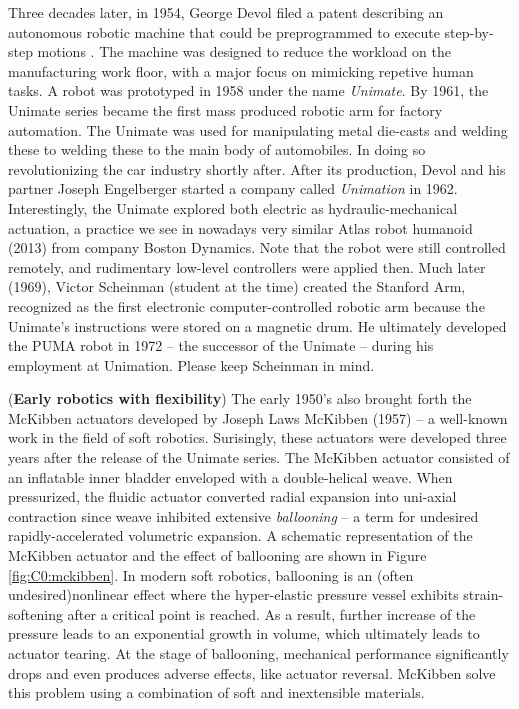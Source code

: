 Three decades later, in 1954, George Devol filed a patent describing an autonomous robotic machine that could be preprogrammed to execute step-by-step motions \cite{Mickle2008}. The machine was designed to reduce the workload on the manufacturing work floor, with a major focus on mimicking repetive human tasks. A robot was prototyped in 1958 under the name \emph{Unimate}. By 1961, the Unimate series became the first mass produced robotic arm for factory automation. The Unimate was used for manipulating metal die-casts and welding these to welding these to the main body of automobiles. In doing so revolutionizing the car industry shortly after. After its production, Devol and his partner Joseph Engelberger started a company called \emph{Unimation} in 1962. 
Interestingly, the Unimate explored both electric as hydraulic-mechanical actuation, a practice we see in nowadays very similar Atlas robot humanoid (2013) from company Boston Dynamics. Note that the robot were still controlled remotely, and rudimentary low-level controllers were applied then. Much later (1969), Victor Scheinman (student at the time) created the Stanford Arm, recognized as the first electronic computer-controlled robotic arm because the Unimate's instructions were stored on a magnetic drum. He ultimately developed the PUMA robot in 1972 -- the successor of the Unimate -- during his employment at Unimation. Please keep Scheinman in mind. \vspace{0.085em}

(\textbf{Early robotics with flexibility}) The early 1950's also brought forth the McKibben actuators developed by Joseph Laws McKibben (1957) -- a well-known work in the field of soft robotics. Surisingly, these actuators were developed three years after the release of the Unimate series. The McKibben actuator consisted of an inflatable inner bladder enveloped with a double-helical weave. When pressurized, the fluidic actuator converted radial expansion into uni-axial contraction since weave inhibited extensive \emph{ballooning} -- a term for undesired rapidly-accelerated volumetric expansion. A schematic representation of the McKibben actuator and the effect of ballooning are shown in Figure \ref{fig:C0:mckibben}. In modern soft robotics, ballooning is an (often undesired)nonlinear effect where the hyper-elastic pressure vessel exhibits strain-softening after a critical point is reached. As a result, further increase of the pressure leads to an exponential growth in volume, which ultimately leads to actuator tearing. At the stage of ballooning, mechanical performance significantly drops and even produces adverse effects, like actuator reversal. McKibben solve this problem using a combination of soft and inextensible materials.

